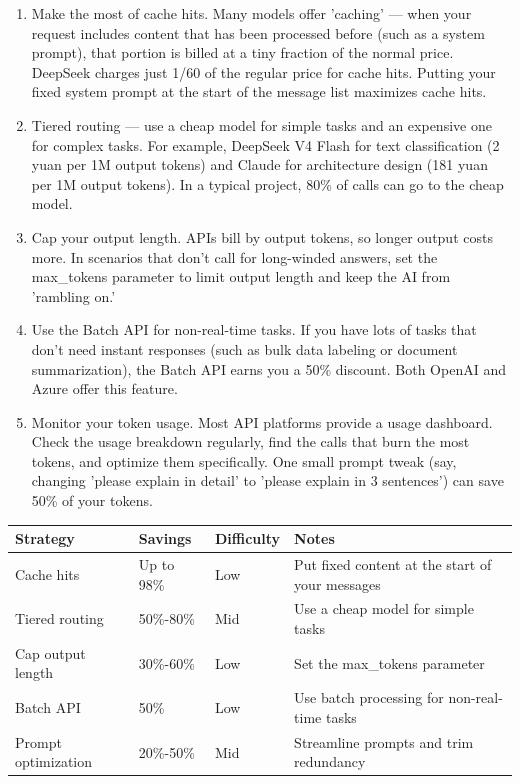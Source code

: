 \begin{enumerate}
  \item Make the most of cache hits. Many models offer 'caching' — when your request includes content that has been processed before (such as a system prompt), that portion is billed at a tiny fraction of the normal price. DeepSeek charges just 1/60 of the regular price for cache hits. Putting your fixed system prompt at the start of the message list maximizes cache hits.
  \item Tiered routing — use a cheap model for simple tasks and an expensive one for complex tasks. For example, DeepSeek V4 Flash for text classification (2 yuan per 1M output tokens) and Claude for architecture design (181 yuan per 1M output tokens). In a typical project, 80\% of calls can go to the cheap model.
  \item Cap your output length. APIs bill by output tokens, so longer output costs more. In scenarios that don't call for long-winded answers, set the max\_tokens parameter to limit output length and keep the AI from 'rambling on.'
  \item Use the Batch API for non-real-time tasks. If you have lots of tasks that don't need instant responses (such as bulk data labeling or document summarization), the Batch API earns you a 50\% discount. Both OpenAI and Azure offer this feature.
  \item Monitor your token usage. Most API platforms provide a usage dashboard. Check the usage breakdown regularly, find the calls that burn the most tokens, and optimize them specifically. One small prompt tweak (say, changing 'please explain in detail' to 'please explain in 3 sentences') can save 50\% of your tokens.
\end{enumerate}

\begin{center}
\begin{tabularx}{\linewidth}{|X|X|X|X|}
\hline
\textbf{Strategy} & \textbf{Savings} & \textbf{Difficulty} & \textbf{Notes} \tabularnewline
\hline
Cache hits & Up to 98\% & Low & Put fixed content at the start of your messages \tabularnewline
Tiered routing & 50\%-80\% & Mid & Use a cheap model for simple tasks \tabularnewline
Cap output length & 30\%-60\% & Low & Set the max\_tokens parameter \tabularnewline
Batch API & 50\% & Low & Use batch processing for non-real-time tasks \tabularnewline
Prompt optimization & 20\%-50\% & Mid & Streamline prompts and trim redundancy \tabularnewline
\hline
\end{tabularx}
\end{center}

